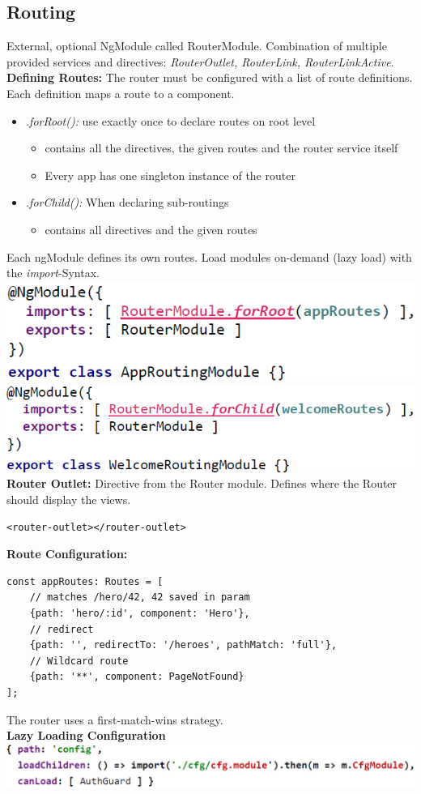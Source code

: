 \subsection{Routing}
External, optional NgModule called RouterModule.
Combination of multiple provided services and directives: \textit{RouterOutlet, RouterLink, RouterLinkActive}.\\
\textbf{Defining Routes:} The router must be configured with a list of route definitions.
Each definition maps a route to a component.
\begin{itemize}
    \item \textit{.forRoot():} use exactly once to declare routes on root level
    \begin{itemize}
        \item contains all the directives, the given routes and the router service itself
        \item Every app has one singleton instance of the router
    \end{itemize}
    \item \textit{.forChild():} When declaring sub-routings
    \begin{itemize}
        \item contains all directives and the given routes
    \end{itemize}
\end{itemize}
Each ngModule defines its own routes.
Load modules on-demand (lazy load) with the \textit{import}-Syntax.\\
\includegraphics[width=0.5\linewidth]{img/angular_routing.png}
\includegraphics[width=0.5\linewidth]{img/angular_routing2.png}
\textbf{Router Outlet:} Directive from the Router module.
Defines where the Router should display the views.
\begin{lstlisting}
<router-outlet></router-outlet>
\end{lstlisting}
\textbf{Route Configuration:}
\begin{lstlisting}
const appRoutes: Routes = [
    // matches /hero/42, 42 saved in param
    {path: 'hero/:id', component: 'Hero'},
    // redirect
    {path: '', redirectTo: '/heroes', pathMatch: 'full'},
    // Wildcard route
    {path: '**', component: PageNotFound}  
];
\end{lstlisting}
The router uses a first-match-wins strategy.\\
\textbf{Lazy Loading Configuration}\\
\includegraphics[width=0.8\linewidth]{img/angular_lazy_loading_routes.png}


